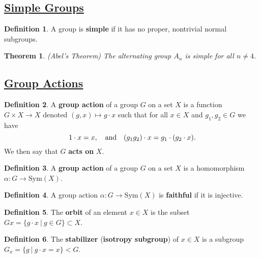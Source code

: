 \documentclass[11pt]{amsart}
\newtheorem*{theorem*}{Theorem}
\theoremstyle{definition}
\newtheorem*{definition*}{Definition}
\renewcommand\:{\colon}
\newcommand{\1}{\mathds{1}}
\newcommand{\Sym}{\text{Sym}}
\begin{document}
\clearpage



\subsection*{\underline{Simple Groups}}

\begin{definition*}
	A group is \textbf{simple} if it has no proper, nontrivial normal subgroups.
\end{definition*}

\begin{theorem*}
	\textnormal{(Abel's Theorem)} The alternating group $A_n$ is simple for all $n \neq 4$.
\end{theorem*}
\vskip20pt



\subsection*{\underline{Group Actions}}

\begin{definition*}
	A \textbf{group action} of a group $G$ on a set $X$ is a function $G \times X \to X$ denoted $(g, x) \mapsto g \cdot x$ such that for all $x \in X$ and $g_1, g_2 \in G$ we have
		\[ 1\cdot x = x, \hskip10pt \text{and} \hskip10pt (g_1g_2) \cdot x = g_1 \cdot (g_2 \cdot x). \]
	We then say that $G$ \textbf{acts on} $X$.
\end{definition*}

\begin{definition*}
	A \textbf{group action} of a group $G$ on a set $X$ is a homomorphism $\alpha\: G \to \Sym(X)$.
\end{definition*}

\begin{definition*}
	A group action $\alpha\: G \to \Sym(X)$ is \textbf{faithful} if it is injective.
\end{definition*}

\begin{definition*}
	The \textbf{orbit} of an element $x \in X$ is the subset $Gx = \{ g \cdot x \ | \ g \in G\} \subset X$.
\end{definition*}

\begin{definition*}
	The \textbf{stabilizer} (\textbf{isotropy subgroup}) of $x \in X$ is a subgroup $G_x = \{ g \ | \ g \cdot x = x \} < G$.
\end{definition*}
\end{document}
